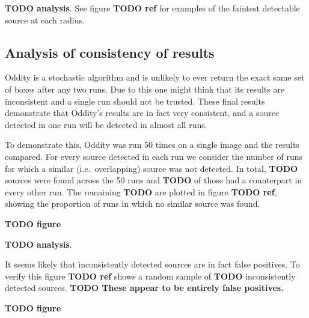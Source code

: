 \documentclass[manuscript]{aastex}
\newcommand{\TODO}[1]{\textbf{TODO #1}}
\begin{document}
\TODO{analysis}. See figure \TODO{ref} for examples of the faintest detectable source at each radius.

\subsection{Analysis of consistency of results}

Oddity is a stochastic algorithm and is unlikely to ever return the exact same set of boxes after any two runs. Due to this one might think that its results are inconsistent and a single run should not be trusted. These final results demonstrate that Oddity's results are in fact very consistent, and a source detected in one run will be detected in almost all runs.

To demonstrate this, Oddity was run 50 times on a single image and the results compared. For every source detected in each run we consider the number of runs for which a similar (i.e.\ overlapping) source was not detected. In total, \TODO{} sources were found across the 50 runs and \TODO{} of those had a counterpart in every other run. The remaining \TODO{} are plotted in figure \TODO{ref}, showing the proportion of runs in which no similar source was found.

\TODO{figure}

\TODO{analysis}.

It seems likely that inconsistently detected sources are in fact false positives. To verify this figure \TODO{ref} shows a random sample of \TODO{} inconsistently detected sources. \TODO{These appear to be entirely false positives.}

\TODO{figure}
\end{document}
